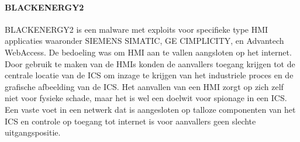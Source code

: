 {\paragraph{BLACKENERGY2}
BLACKENERGY2 is een malware met exploits voor specifieke type HMI applicaties waaronder
SIEMENS SIMATIC, GE CIMPLICITY, en Advantech WebAccess. De bedoeling was om HMI aan te vallen
aangsloten op het internet. Door gebruik te maken van de HMIs konden de aanvallers toegang
krijgen tot de centrale locatie van de ICS om inzage te krijgen van het industriele proces en de
grafische afbeelding van de ICS. Het aanvallen van een HMI zorgt op zich zelf niet voor fysieke
schade, maar het is wel een doelwit voor spionage in een ICS. Een vaste voet in een netwerk dat is
aangesloten op talloze componenten van het ICS en controle op toegang tot internet is voor
aanvallers geen slechte uitgangspositie.

}
